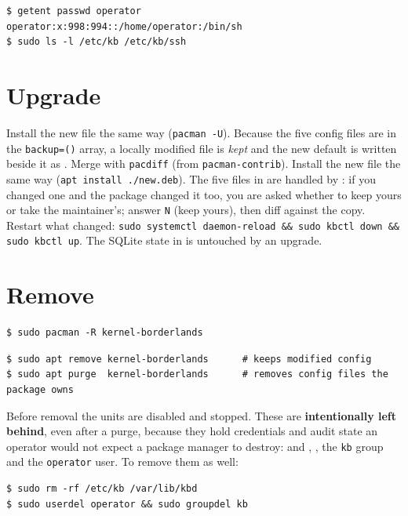 \begin{lstlisting}[style=console]
$ getent passwd operator
operator:x:998:994::/home/operator:/bin/sh
$ sudo ls -l /etc/kb /etc/kb/ssh
\end{lstlisting}

\section{Upgrade}
\ifarch
Install the new file the same way (\texttt{pacman -U}). Because the five config files are in the
\texttt{backup=()} array, a locally modified file is \emph{kept} and the new default is written beside it as
. Merge with \texttt{pacdiff} (from \texttt{pacman-contrib}).
\else
Install the new file the same way (\texttt{apt install ./new.deb}). The five files in  are
handled by : if you changed one and the package changed it too, you are asked whether to keep yours or
take the maintainer's; answer \texttt{N} (keep yours), then diff against the  copy.
\fi
Restart what changed: \texttt{sudo systemctl daemon-reload \&\& sudo kbctl down \&\& sudo kbctl up}.
The SQLite state in  is untouched by an upgrade.

\section{Remove}
\ifarch
\begin{lstlisting}[style=console]
$ sudo pacman -R kernel-borderlands
\end{lstlisting}
\else
\begin{lstlisting}[style=console]
$ sudo apt remove kernel-borderlands      # keeps modified config
$ sudo apt purge  kernel-borderlands      # removes config files the package owns
\end{lstlisting}
\fi
Before removal the units are disabled and stopped. These are \textbf{intentionally left behind}, even after a
purge, because they hold credentials and audit state an operator would not expect a package manager to destroy:
 and , , the \texttt{kb} group and the
\texttt{operator} user. To remove them as well:
\begin{lstlisting}[style=console]
$ sudo rm -rf /etc/kb /var/lib/kbd
$ sudo userdel operator && sudo groupdel kb
\end{lstlisting}

